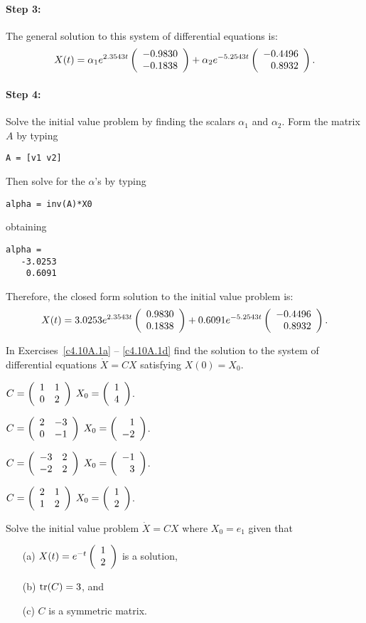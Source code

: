 \paragraph{Step 3:}  The general solution to this system of differential
equations is:
\[
X(t) = \alpha_1 e^{2.3543t}\left(\begin{array}{r} -0.9830 \\ -0.1838\end{array}\right) +
\alpha_2e^{-5.2543t}\left(\begin{array}{r} -0.4496 \\ 0.8932\end{array}\right).
\]


\paragraph{Step 4:}  Solve the initial value problem by finding the scalars
$\alpha_1$ and $\alpha_2$.   Form the matrix $A$ by typing
\begin{verbatim}
A = [v1 v2]
\end{verbatim}
Then solve for the $\alpha$'s by typing
\begin{verbatim}
alpha = inv(A)*X0
\end{verbatim}
obtaining
\begin{verbatim}
alpha =
   -3.0253
    0.6091
\end{verbatim}

Therefore, the closed form solution to the initial value problem is:
\[
X(t) = 3.0253 e^{2.3543t}\left(\begin{array}{r} 0.9830 \\ 0.1838\end{array}\right) +
0.6091 e^{-5.2543t}\left(\begin{array}{r} -0.4496 \\ 0.8932\end{array}\right).
\]

\EXER

\TEXER

\noindent In Exercises~\ref{c4.10A.1a} -- \ref{c4.10A.1d} find the solution
to the system of differential equations $\dot{X} = CX$ satisfying $X(0)=X_0$.
\begin{exercise}  \label{c4.10A.1a}
$C = \left(\begin{array}{rr} 1 & 1\\ 0 &2\end{array}\right)$ \AND $X_0 = \left(\begin{array}{r} 1 \\ 4\end{array}\right)$.
\end{exercise}
\begin{exercise}  \label{c4.10A.1b}
$C = \left(\begin{array}{rr} 2 & -3\\ 0 &-1\end{array}\right)$ \AND $X_0 = \left(\begin{array}{r} 1 \\ -2\end{array}\right)$.
\end{exercise}
\begin{exercise}  \label{c4.10A.1c}
$C = \left(\begin{array}{rr} -3 & 2\\ -2 &2\end{array}\right)$ \AND $X_0 = \left(\begin{array}{r} -1 \\ 3\end{array}\right)$.
\end{exercise}
\begin{exercise}  \label{c4.10A.1d}
$C = \left(\begin{array}{rr} 2 & 1\\ 1 &2\end{array}\right)$ \AND $X_0 = \left(\begin{array}{r} 1 \\ 2\end{array}\right)$.
\end{exercise}

\begin{exercise}  \label{c4.10A.2}
Solve the initial value problem $\dot{X}=CX$ where $X_0=e_1$ given that
\begin{itemize}
\item[(a)]	$X(t) = e^{-t}\left(\begin{array}{r} 1 \\ 2\end{array}\right)$ is a solution,
\item[(b)]	${\rm tr}(C)=3$, and
\item[(c)]	$C$ is a symmetric matrix.
\end{itemize}
\end{exercise}

